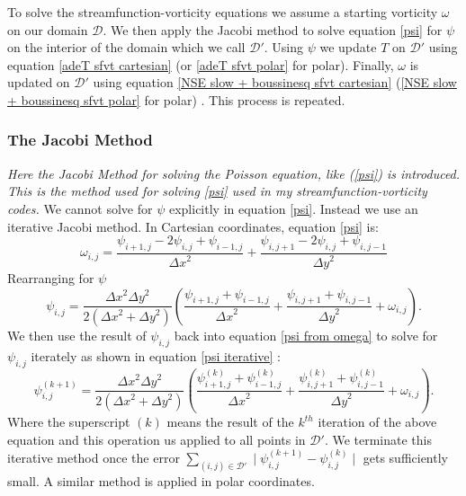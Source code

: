 \documentclass{article}
\begin{document}
\newline
To solve the streamfunction-vorticity equations we assume a starting vorticity $\omega$ on our domain $\mathcal{D}$. We then apply the Jacobi method to solve equation \ref{psi} for $\psi$ on the interior of the domain which we call $\mathcal{D}'$. 
Using $\psi$ we update $T$ on $\mathcal{D}'$ using equation \ref{adeT sfvt cartesian} (or \ref{adeT sfvt polar} for polar). Finally, $\omega$ is updated on $\mathcal{D}'$ using 
equation \ref{NSE slow + boussinesq sfvt cartesian} (\ref{NSE slow + boussinesq sfvt polar} for polar) \cite{adair2015developing}. This process is repeated.

\subsubsection*{The Jacobi Method}
{\it{Here the Jacobi Method for solving the Poisson equation, like (\ref{psi}) is introduced. This is the method used for solving \ref{psi} used in my streamfunction-vorticity codes.}}
\vspace{0.3cm}
\newline
We cannot solve for $\psi$ explicitly in equation \ref{psi}. Instead we use an iterative Jacobi method. In Cartesian coordinates, equation \ref{psi} is:
\begin{equation}
	\omega_{i,j} = \frac{\psi_{i+1,j} - 2 \psi_{i,j} + \psi_{i-1,j}  }{{\Delta x}^2} + \frac{\psi_{i,j+1} - 2 \psi_{i,j} + \psi_{i,j-1}  }{{\Delta y}^2}
	\label{psi disc}
\end{equation}
Rearranging for $\psi$
\begin{equation}
	\psi_{i,j} = \frac{{\Delta x}^2 {\Delta y}^2  }{2({\Delta x}^2  + {\Delta y}^2)} (\frac{\psi_{i+1,j} +\psi_{i-1,j} }{{\Delta x}^2} + \frac{\psi_{i,j+1} +\psi_{i,j-1}  }{{\Delta y}^2 }  + \omega_{i,j}).
	\label{psi from omega}
\end{equation}
We then use the result of $\psi_{i,j}$ back into equation \ref{psi from omega} to solve for $\psi_{i,j}$ iterately as shown in equation \ref{psi iterative} \cite{burkardt2011jacobi, adair2015developing}:
\begin{equation}
	\psi_{i,j}^{(k+1)} = \frac{{\Delta x}^2 {\Delta y}^2  }{2({\Delta x}^2  + {\Delta y}^2)} (\frac{\psi_{i+1,j}^{(k)} +\psi_{i-1,j}^{(k)}  }{{\Delta x}^2} + \frac{\psi_{i,j+1}^{(k)} +\psi_{i,j-1}^{(k)}  }{{\Delta y}^2 } + \omega_{i,j}).
	\label{psi iterative}
\end{equation}
Where the superscript $(k)$ means the result of the $k^{th}$ iteration of the above equation and this operation us applied to all points in $\mathcal{D}'$.
 We terminate this iterative method once the error $\sum_{(i,j) \in \mathcal{D'}} \mid \psi_{i,j}^{(k+1)} - \psi_{i,j}^{(k)} \mid$ gets sufficiently small. A similar method is applied in polar coordinates. 
\end{document}
